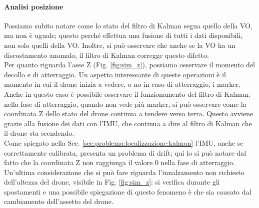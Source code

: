 \paragraph{Analisi posizione} Possiamo subito notare come lo stato del filtro di Kalman segua quello della VO, ma non è uguale; questo perché effettua una fusione di tutti i dati disponibili, non solo quelli della VO. Inoltre, si può osservare che anche se la VO ha un discostamento anomalo, il filtro di Kalman corregge questo difetto. \\ 
Per quanto riguarda l'asse Z (Fig. \ref{fig:sim_z}), possiamo osservare il momento del decollo e di atterraggio. Un aspetto interessante di queste operazioni è il momento in cui il drone inizia a vedere, o no in caso di atterraggio, i marker. Anche in questo caso è possibile osservare il funzionamento del filtro di Kalman: nella fase di atterraggio, quando non vede più marker, si può osservare come la coordinata Z dello stato del drone continua a tendere verso terra. Questo avviene grazie alla fusione dei dati con l'IMU, che continua a dire al filtro di Kalman che il drone sta scendendo. \\
Come spiegato nella Sec. \ref{sec:problema:localizzazione:kalman} l'IMU, anche se correttamente calibrata, presenta un problema di drift; qui lo si può notare dal fatto che la coordinata Z non raggiunga il valore 0 nella fase di atterraggio.\\
Un'ultima considerazione che si può fare riguarda l'innalzamento non richiesto dell'altezza del drone, visibile in Fig. \ref{fig:sim_z}: si verifica durante gli spostamenti e una possibile spiegazione di questo fenomeno è che sia causato dal cambiamento dell'assetto del drone.

